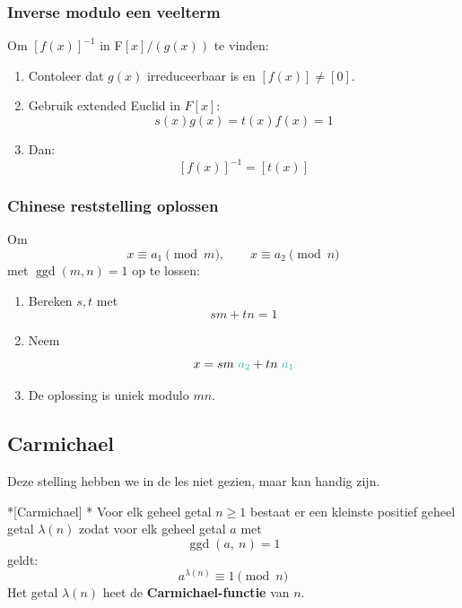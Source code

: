 \subsubsection{Inverse modulo een veelterm}

Om $\left[f(x)\right]^{-1}$ in F$\left[x\right]/\left(g(x)\right)$ te vinden:
\begin{enumerate}
    \item Contoleer dat $g(x)$ irreduceerbaar is en $\left[f(x)\right] \neq [0]$.
    \item Gebruik extended Euclid in $F[x]$:
    \begin{equation*}
        s(x)g(x) = t(x)f(x) = 1
    \end{equation*}
    \item Dan:
    \begin{equation*}
        \left[f(x)\right]^{-1} = \left[t(x)\right]
    \end{equation*}
\end{enumerate}

\subsubsection{Chinese reststelling oplossen}

Om
\begin{equation*}
    x \equiv a_1 \pmod m, \qquad x \equiv a_2 \pmod n
\end{equation*}
met $\operatorname{ggd}(m, n) = 1$ op te lossen:
\begin{enumerate}
    \item Bereken $s,t$ met
    \begin{equation*}
        sm + tn = 1
    \end{equation*}
    \item Neem
    \begin{equation*}
        x = sm\ \textcolor{Aquamarine}{a_2} + tn\ \textcolor{Aquamarine}{a_1}
    \end{equation*}
    \item De oplossing is uniek modulo $mn$.
\end{enumerate}

\subsection{Carmichael}

Deze stelling hebben we in de les niet gezien, maar kan handig zijn.

\begin{nicetheorem}*[Carmichael]\label{l6_carmichael}
    \nextpart[]*
    Voor elk geheel getal $n \ge 1$ bestaat er een kleinste positief geheel getal $\lambda(n)$ zodat voor elk geheel getal $a$ met
    \begin{equation*}
        \operatorname{ggd}(a,\ n) = 1
    \end{equation*}
    geldt:
    \begin{equation*}
        a^{\lambda(n)} \equiv 1 \pmod n
    \end{equation*}
    Het getal $\lambda(n)$ heet de \textcolor{red!75!black}{\textbf{Carmichael-functie}} van $n$.
\end{nicetheorem}

